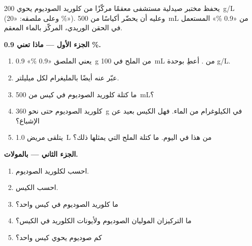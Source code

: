 \begin{problem}
\label{pb:g10:concentration-and-dilution:1}
يحفظ مختبر صيدلية مستشفى  معقمًا مركّزًا من كلوريد الصوديوم يحوي
\qty{200}{g/L} (وعلى ملصقه: «20 \%»). وعليه أن يحضّر أكياسًا من
\qty{500}{mL} من  «0.9 \%» المستعمل في الحقن الوريدي، 
 المركّز بالماء المعقم.

\medskip
\noindent\textbf{الجزء الأول --- ماذا تعني 0.9 \%.}
\begin{enumerate}
  \item يعني الملصق «0.9 \%» \qty{0.9}{g} من الملح في \qty{100}{mL}
        من . أعطِ  بوحدة \si{g/L}.
  \item عبّر عنه أيضًا بالمليغرام لكل ميليلتر.
  \item ما كتلة كلوريد الصوديوم في كيس من \qty{500}{mL}؟
  \item {} كلوريد الصوديوم حتى نحو \qty{360}{g} في الكيلوغرام من
        الماء. فهل  الكيس بعيد عن الإشباع؟
  \item يتلقى مريض \qty{1.0}{L} من هذا  في اليوم. ما كتلة الملح
        التي يمثلها ذلك؟
\end{enumerate}

\medskip
\noindent\textbf{الجزء الثاني --- بالمولات.}
\begin{enumerate}[resume]
  \item احسب  لكلوريد الصوديوم.
  \item احسب   الكيس.
  \item ما  كلوريد الصوديوم في كيس واحد؟
  \item ما التركيزان الموليان  الصوديوم ولأيونات الكلوريد في
        الكيس؟
  \item كم  صوديوم يحوي كيس واحد؟
\end{enumerate}


\end{problem}
